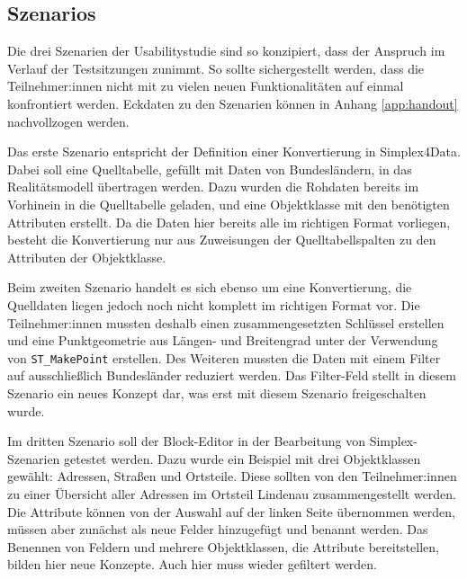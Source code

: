 \subsection{Szenarios}
\label{sec:study-szenarios}
Die drei Szenarien der Usabilitystudie sind so konzipiert, dass der Anspruch im Verlauf der Testsitzungen zunimmt. So sollte sichergestellt werden, dass die Teilnehmer:innen nicht mit zu vielen neuen Funktionalitäten auf einmal konfrontiert werden. Eckdaten zu den Szenarien können in Anhang \ref{app:handout} nachvollzogen werden.

Das erste Szenario entspricht der Definition einer Konvertierung in Simplex4Data. Dabei soll eine Quelltabelle, gefüllt mit Daten von Bundesländern, in das Realitätsmodell übertragen werden. Dazu wurden die Rohdaten bereits im Vorhinein in die Quelltabelle geladen, und eine Objektklasse mit den benötigten Attributen erstellt.  Da die Daten hier bereits alle im richtigen Format vorliegen, besteht die Konvertierung nur aus Zuweisungen der Quelltabellspalten zu den Attributen der Objektklasse. 

Beim zweiten Szenario handelt es sich ebenso um eine Konvertierung, die Quelldaten liegen jedoch noch nicht komplett im richtigen Format vor. Die Teilnehmer:innen mussten deshalb einen zusammengesetzten Schlüssel erstellen und eine Punktgeometrie aus Längen- und Breitengrad unter der Verwendung von \texttt{ST\_MakePoint} erstellen. Des Weiteren mussten die Daten mit einem Filter auf ausschließlich Bundesländer reduziert werden. Das Filter-Feld stellt in diesem Szenario ein neues Konzept dar, was erst mit diesem Szenario freigeschalten wurde.

Im dritten Szenario soll der Block-Editor in der Bearbeitung von Simplex-Szenarien getestet werden. Dazu wurde ein Beispiel mit drei Objektklassen gewählt: Adressen, Straßen und Ortsteile. Diese sollten von den Teilnehmer:innen zu einer Übersicht aller Adressen im Ortsteil Lindenau zusammengestellt werden. Die Attribute können von der Auswahl auf der linken Seite übernommen werden, müssen aber zunächst als neue Felder hinzugefügt und benannt werden. Das Benennen von Feldern und mehrere Objektklassen, die Attribute bereitstellen, bilden hier neue Konzepte. Auch hier muss wieder gefiltert werden.
